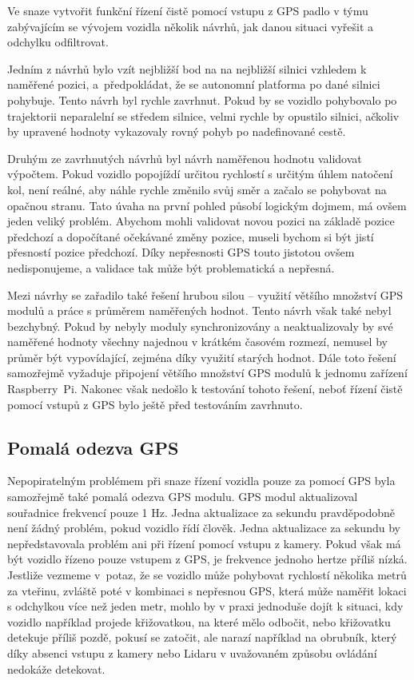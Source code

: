 \documentclass[czech, bachelor]{diploma}
\begin{document}
Ve snaze vytvořit funkční řízení čistě pomocí vstupu z GPS padlo v týmu zabývajícím se vývojem vozidla několik návrhů, jak danou
situaci vyřešit a odchylku odfiltrovat.

Jedním z návrhů bylo vzít nejbližší bod na na nejbližší silnici vzhledem k naměřené pozici, a~předpokládat, že se autonomní
platforma po dané silnici pohybuje. Tento návrh byl rychle zavrhnut. Pokud by se vozidlo pohybovalo po trajektorii neparalelní
se středem silnice, velmi rychle by opustilo silnici, ačkoliv by upravené hodnoty vykazovaly rovný pohyb po nadefinované cestě.

Druhým ze zavrhnutých návrhů byl návrh naměřenou hodnotu validovat výpočtem. Pokud vozidlo popojíždí určitou rychlostí s určitým
úhlem natočení kol, není reálné, aby náhle rychle změnilo svůj směr a začalo se pohybovat na opačnou stranu. Tato úvaha na první
pohled působí logickým dojmem, má ovšem jeden veliký problém. Abychom mohli validovat novou pozici na základě pozice předchozí
a dopočítané očekávané změny pozice, museli bychom si být jistí přesností pozice předchozí. Díky nepřesnosti GPS touto jistotou
ovšem nedisponujeme, a validace tak může být problematická a nepřesná.

Mezi návrhy se zařadilo také řešení hrubou silou -- využití většího množství GPS modulů a práce s průměrem naměřených hodnot.
Tento návrh však také nebyl bezchybný. Pokud by nebyly moduly synchronizovány a neaktualizovaly by své naměřené hodnoty všechny
najednou v krátkém časovém rozmezí, nemusel by průměr být vypovídající, zejména díky využití starých hodnot. Dále toto řešení
samozřejmě vyžaduje připojení většího množství GPS modulů k jednomu zařízení Raspberry~Pi. Nakonec však nedošlo k testování tohoto
řešení, neboť řízení čistě pomocí vstupů z GPS bylo ještě před testováním zavrhnuto.

\subsection{Pomalá odezva GPS} \label{gps-low-polling-rate}

Nepopiratelným problémem při snaze řízení vozidla pouze za pomocí GPS byla samozřejmě také pomalá odezva GPS modulu. GPS modul
aktualizoval souřadnice frekvencí pouze 1 Hz. Jedna aktualizace za sekundu pravděpodobně není žádný problém, pokud vozidlo řídí
člověk. Jedna aktualizace za sekundu by nepředstavovala problém ani při řízení pomocí vstupu z kamery. Pokud však má být vozidlo
řízeno pouze vstupem z GPS, je frekvence jednoho hertze příliš nízká. Jestliže vezmeme v~potaz, že se vozidlo může pohybovat
rychlostí několika metrů za vteřinu, zvláště poté v kombinaci s nepřesnou GPS, která může naměřit lokaci s odchylkou více než
jeden metr, mohlo by v praxi jednoduše dojít k situaci, kdy vozidlo například projede křižovatkou, na které mělo odbočit, nebo
křižovatku detekuje příliš pozdě, pokusí se zatočit, ale narazí například na obrubník, který díky absenci vstupu z kamery nebo
Lidaru v uvažovaném způsobu ovládání nedokáže detekovat.
\end{document}
